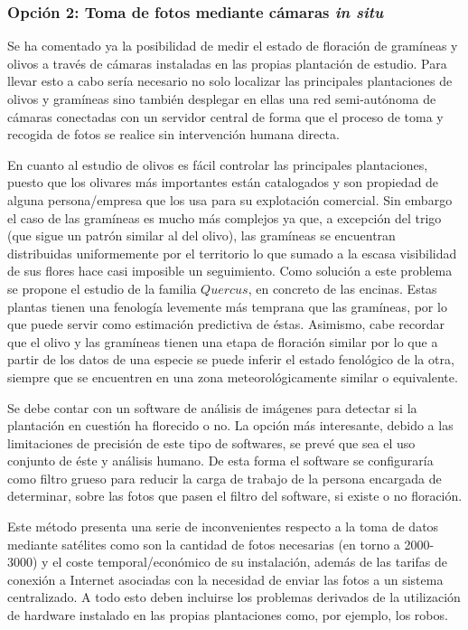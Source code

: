 \documentclass[12pt,oneside,a4paper]{article}
\numberwithin{figure}{section}
\begin{document}
\subsubsection{Opción 2: Toma de fotos mediante cámaras \textit{in situ}}

Se ha comentado ya la posibilidad de medir el estado de floración de gramíneas y olivos a través de cámaras instaladas en las propias plantación de estudio. Para llevar esto a cabo sería necesario no solo localizar las principales plantaciones de olivos y gramíneas sino también desplegar en ellas una red semi-autónoma de cámaras conectadas con un servidor central de forma que el proceso de toma y recogida de fotos se realice sin intervención humana directa.

En cuanto al estudio de olivos es fácil controlar las principales plantaciones, puesto que los olivares más importantes están catalogados y son propiedad de alguna persona/empresa que los usa para su explotación comercial. Sin embargo el caso de las gramíneas es mucho más complejos ya que, a excepción del trigo (que sigue un patrón similar al del olivo), las gramíneas se encuentran distribuidas uniformemente por el territorio lo que sumado a la escasa visibilidad de sus flores hace casi imposible un seguimiento. Como solución a este problema se propone el estudio de la familia $Quercus$, en concreto de las encinas. Estas plantas tienen una fenología levemente más temprana que las gramíneas, por lo que puede servir como estimación predictiva de éstas. Asimismo, cabe recordar que el olivo y las gramíneas tienen una etapa de floración similar por lo que a partir de los datos de una especie se puede inferir el estado fenológico de la otra, siempre que se encuentren en una zona meteorológicamente similar o equivalente.

Se debe contar con un software de análisis de imágenes para detectar si la plantación en cuestión ha florecido o no. La opción más interesante, debido a las limitaciones de precisión de este tipo de softwares, se prevé que sea el uso conjunto de éste y análisis humano. De esta forma el software se configuraría como filtro grueso para reducir la carga de trabajo de la persona encargada de determinar, sobre las fotos que pasen el filtro del software, si existe o no floración.

Este método presenta una serie de inconvenientes respecto a la toma de datos mediante satélites como son la cantidad de fotos necesarias (en torno a 2000-3000) y el coste temporal/económico de su instalación, además de las tarifas de conexión a Internet asociadas con la necesidad de enviar las fotos a un sistema centralizado. A todo esto deben incluirse los problemas derivados de la utilización de hardware instalado en las propias plantaciones como, por ejemplo, los robos.
\end{document}
